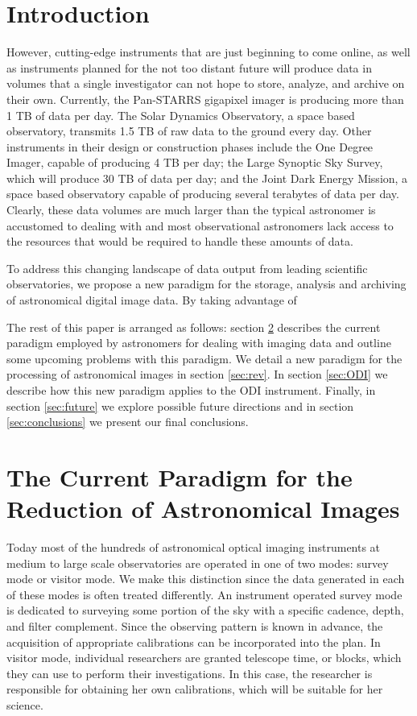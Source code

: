 \documentclass[10pt,conference]{IEEEtran}
\begin{document}
\section{Introduction}\label{sec:intro}

However, cutting-edge instruments that are just beginning to come online, as well as instruments planned for the not too distant future will produce data in volumes that a single investigator can not hope to store, analyze, and archive on their own. Currently, the Pan-STARRS gigapixel imager is producing more than 1 TB of data per day. The Solar Dynamics Observatory, a space based observatory, transmits 1.5 TB of raw data to the ground every day. Other instruments in their design or construction phases include the One Degree Imager, capable of producing 4 TB per day; the Large Synoptic Sky Survey, which will produce 30 TB of data per day; and the Joint Dark Energy Mission, a space based observatory capable of producing several terabytes of data per day. Clearly, these data volumes are much larger than the typical astronomer is accustomed to dealing with and most observational astronomers lack access to the resources that would be required to handle these amounts of data.

To address this changing landscape of data output from leading scientific observatories, we propose a new paradigm for the storage, analysis and archiving of astronomical digital image data. By taking advantage of

The rest of this paper is arranged as follows: section \ref{sec:current} describes the current paradigm employed by astronomers for dealing with imaging data and outline some upcoming problems with this paradigm. We detail a new paradigm for the processing of astronomical images in section \ref{sec:rev}. In section \ref{sec:ODI} we describe how this new paradigm applies to the ODI instrument. Finally, in section \ref{sec:future} we explore possible future directions and in section \ref{sec:conclusions} we present our final conclusions.

\section{The Current Paradigm for the Reduction of Astronomical Images}\label{sec:current}

Today most of the hundreds of astronomical optical imaging instruments at medium to large scale observatories are operated in one of two modes: survey mode or visitor mode. We make this distinction since the data generated in each of these modes is often treated differently. An instrument operated survey mode is dedicated to surveying some portion of the sky with a specific cadence, depth, and filter complement. Since the observing pattern is known in advance, the acquisition of appropriate calibrations can be incorporated into the plan. In visitor mode, individual researchers are granted telescope time, or blocks, which they can use to perform their investigations. In this case, the researcher is responsible for obtaining her own calibrations, which will be suitable for her science. 
\end{document}
